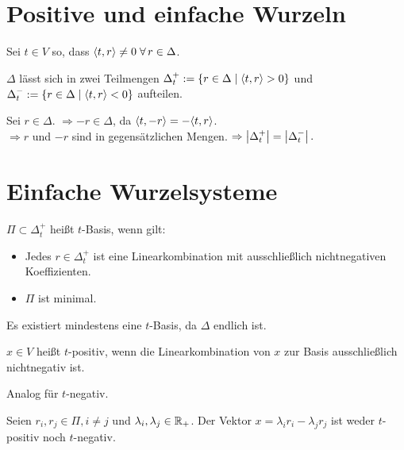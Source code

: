 \documentclass{handout}
\begin{document}
\maketitle
\section{Positive und einfache Wurzeln}
\begin{defi}
    Sei \( t \in V \) so, dass \( \scalarprod{t}{r} \neq 0 
    \; \forall r \in \Delta \).

    \( \Delta \) lässt sich in zwei Teilmengen 
    \( \Delta_t^+ := 
    \{r \in \Delta \;\vert \; \langle t, r \rangle > 0\} \) 
    und \( \Delta_t^- := 
    \{r \in \Delta \;\vert \; \langle t, r \rangle < 0\} \) 
    aufteilen. 
\end{defi}

Sei \( r \in \Delta \). \( \Rightarrow -r \in \Delta \), 
da \( \langle t, -r \rangle = -\langle t, r \rangle \).\\
\( \Rightarrow r \) und \( -r \) sind in 
gegensätzlichen Mengen. 
\( \Rightarrow \left|\Delta_t^+\right| = \left|\Delta_t^-\right|. \)

\section{Einfache Wurzelsysteme}
\begin{defi}[\( t \)-Basis]
    \( \Pi \subset \Delta_t^+ \) heißt \( t \)-Basis, 
    wenn gilt:
    \begin{itemize}
        \item Jedes \( r \in \Delta_t^+ \) ist 
        eine Linearkombination mit ausschließlich 
        nichtnegativen Koeffizienten.
        \item \( \Pi \) ist minimal.
    \end{itemize}
    Es existiert mindestens eine \( t \)-Basis, 
    da \( \Delta \) endlich ist.
\end{defi}

\begin{defi}[\( t \)-positiv]
    \( x \in V \) heißt \(t\)-positiv, wenn 
    die Linearkombination von \(x\) zur 
    Basis ausschließlich nichtnegativ ist.

    Analog für \( t \)-negativ.
\end{defi}

\begin{satz}
    Seien \( r_i, r_j \in \Pi, i \neq j \) und 
    \( \lambda_i, \lambda_j \in \mathbb{R}_+ \). 
    Der Vektor \( x = \lambda_i r_i - \lambda_j r_j \) 
    ist weder \( t \)-positiv noch \( t \)-negativ.
\end{satz}
\end{document}

